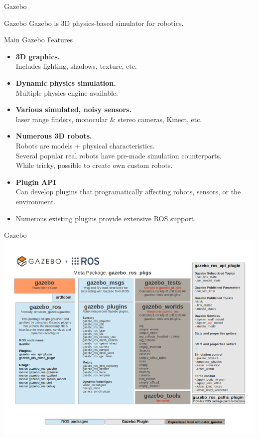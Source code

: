 \documentclass[9pt]{beamer}
\begin{document}
\begin{section}{Gazebo}
    \begin{frame}{Gazebo}
        Gazebo is 3D physics-based simulator for robotics.
        \begin{block}{Main Gazebo Features}
            \begin{itemize}
                \item \textbf{3D graphics.} \\
                Includes lighting, shadows, texture, etc.
                \item \textbf{Dynamic physics simulation.} \\
                Multiple physics engine available.
                \item \textbf{Various simulated, noisy sensors.} \\
                laser range finders, monocular \& stereo cameras, Kinect, etc. 
                \item \textbf{Numerous 3D robots.} \\
                Robots are models + physical characteristics. \\
                Several popular real robots have pre-made simulation counterparts. \\
                While tricky, possible to create own custom robots.
                \item \textbf{Plugin API} \\
                Can develop plugins that programatically affecting robots, sensors, or the environment. 
                \item Numerous existing plugins provide extensive ROS support. 
            \end{itemize}
        \end{block}
    \end{frame}
    \begin{frame}{Gazebo}
        \includegraphics[width=\textwidth,trim={0cm 0cm 0cm 0cm},clip]{gazebo_overview.png}    

\end{frame}
\end{section}
\end{document}

